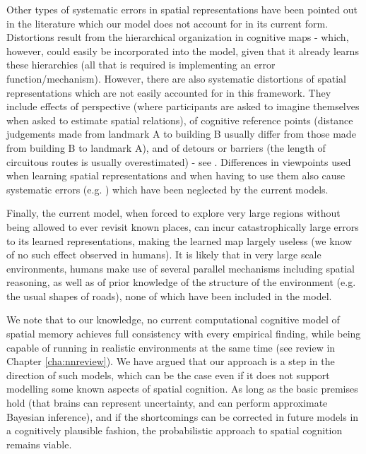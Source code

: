 Other types of systematic errors in spatial representations have been pointed out in the literature which our model does not account for in its current form. Distortions result from the hierarchical organization in cognitive maps \citep{tversky1992distortions,hirtle1985evidence} - which, however, could easily be incorporated into the model, given that it already learns these hierarchies (all that is required is implementing an error function/mechanism). However, there are also systematic distortions of spatial representations which are not easily accounted for in this framework. They include effects of perspective (where participants are asked to imagine themselves when asked to estimate spatial relations), of cognitive reference points (distance judgements made from landmark A to building B usually differ from those made from building B to landmark A), and of detours or barriers (the length of circuitous routes is usually overestimated) - see \citep{tversky1992distortions, tversky2003navigating}. Differences in viewpoints used when learning spatial representations and when having to use them also cause systematic errors (e.g. \citep{shelton2001systems, Shelton2004, burgess2006spatial}) which have been neglected by the current models.

Finally, the current model, when forced to explore very large regions without being allowed to ever revisit known places, can incur catastrophically large errors to its learned representations, making the learned map largely useless (we know of no such effect observed in humans). It is likely that in very large scale environments, humans make use of several parallel mechanisms including spatial reasoning, as well as of prior knowledge of the structure of the environment (e.g. the usual shapes of roads), none of which have been included in the model. 

We note that to our knowledge, no current computational cognitive model of spatial memory achieves full consistency with every empirical finding, while being capable of running in realistic environments at the same time (see review in Chapter \ref{cha:nnreview}). We have argued that our approach is a step in the direction of such models, which can be the case even if it does not support modelling some known aspects of spatial cognition. As long as the basic premises hold (that brains can represent uncertainty, and can perform approximate Bayesian inference), and if the shortcomings can be corrected in future models in a cognitively plausible fashion, the probabilistic approach to spatial cognition remains viable.


